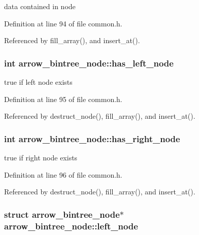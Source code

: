 data contained in node 

Definition at line 94 of file common.h.

Referenced by fill\_\-array(), and insert\_\-at().\hypertarget{structarrow__bintree__node_a359d3d029023fb8763af3329207ee53}{
\subsubsection[{has\_\-left\_\-node}]{\setlength{\rightskip}{0pt plus 5cm}int {\bf arrow\_\-bintree\_\-node::has\_\-left\_\-node}}}
\label{structarrow__bintree__node_a359d3d029023fb8763af3329207ee53}


true if left node exists 

Definition at line 95 of file common.h.

Referenced by destruct\_\-node(), fill\_\-array(), and insert\_\-at().\hypertarget{structarrow__bintree__node_f6f8bb35c520a88841a810777e9bc186}{
\subsubsection[{has\_\-right\_\-node}]{\setlength{\rightskip}{0pt plus 5cm}int {\bf arrow\_\-bintree\_\-node::has\_\-right\_\-node}}}
\label{structarrow__bintree__node_f6f8bb35c520a88841a810777e9bc186}


true if right node exists 

Definition at line 96 of file common.h.

Referenced by destruct\_\-node(), fill\_\-array(), and insert\_\-at().\hypertarget{structarrow__bintree__node_e7eb125cad02704a57796b16c49b2983}{
\subsubsection[{left\_\-node}]{\setlength{\rightskip}{0pt plus 5cm}struct {\bf arrow\_\-bintree\_\-node}$\ast$ {\bf arrow\_\-bintree\_\-node::left\_\-node}}}
\label{structarrow__bintree__node_e7eb125cad02704a57796b16c49b2983}


